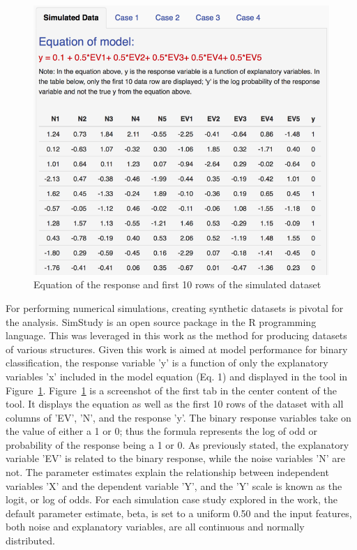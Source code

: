 \documentclass{llncs}
\begin{document}
\begin{figure}
\centering
\includegraphics[scale=0.75]{dataset.png}
\caption{Equation of the response and first 10 rows of the simulated dataset}
\label{fig:dataset}
\end{figure}

For performing numerical simulations, creating synthetic datasets is pivotal for the analysis. SimStudy is an open source package in the R programming language. This was leveraged in this work as the method for producing datasets of various structures. Given this work is aimed at model performance for binary classification, the response variable 'y' is a function of only the explanatory variables 'x' included in the model equation (Eq. 1) and displayed in the tool in Figure~\ref{fig:dataset}.  Figure~\ref{fig:dataset} is a screenshot of the first tab in the center content of the tool.  It displays the equation as well as the first 10 rows of the dataset with all columns of 'EV', 'N', and the response 'y'. The binary response variables take on the value of either a 1 or 0; thus the formula represents the log of odd or probability of the response being a 1 or 0. As previously stated, the explanatory variable 'EV' is related to the binary response, while the noise variables 'N' are not. The parameter estimates explain the relationship between independent variables 'X' and the dependent variable 'Y', and the 'Y' scale is known as the logit, or log of odds. For each simulation case study explored in the work, the default parameter estimate, beta, is set to a uniform 0.50 and the input features, both noise and explanatory variables, are all continuous and normally distributed. 
\end{document}
